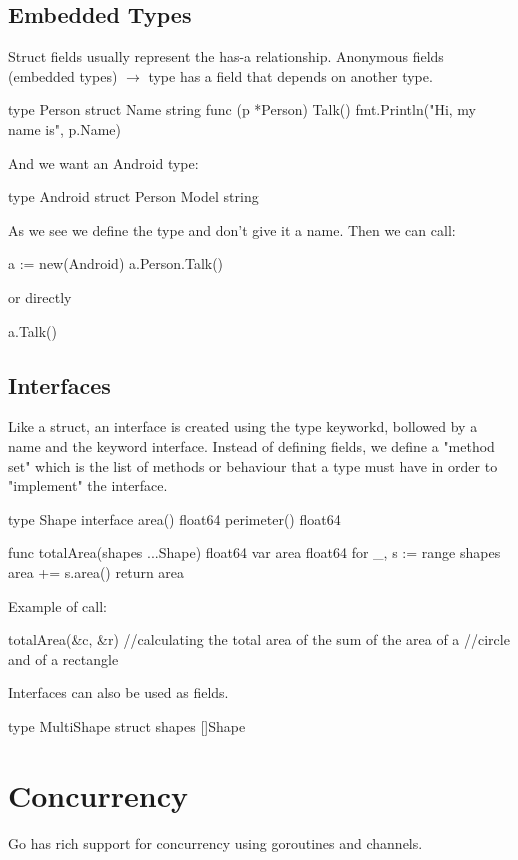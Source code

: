 \documentclass[twoside,a4paper,english]{report}
\begin{document}
\section{Embedded Types}
Struct fields usually represent the has-a relationship. Anonymous fields (embedded types) $\rightarrow$ type has a field that depends on another type.
\begin{go}
type Person struct {
  Name string
}
func (p *Person) Talk() {
  fmt.Println("Hi, my name is", p.Name)
}
\end{go}
\vspace{0.7cm}
And we want an Android type:
\begin{go}
type Android struct {
  Person
  Model string
}
\end{go}
\vspace{0.7cm}
As we see we define the type and don't give it a name. Then we can call:
\begin{go}
a := new(Android)
a.Person.Talk()
\end{go}
\vspace{0.7cm}
or directly
\begin{go}
a.Talk()
\end{go}
\section{Interfaces}
Like a struct, an interface is created using the type keyworkd, bollowed by a name and the keyword interface. Instead of defining fields, we define a "method set" which is the list of methods or behaviour that a type must have in order to "implement" the interface.
\begin{go}
type Shape interface {
  area() float64
  perimeter() float64
}   

func totalArea(shapes ...Shape) float64 {
  var area float64
  for _, s := range shapes {
      area += s.area()
  }
  return area
}
\end{go} 
\vspace{0.7cm}
Example of call:
\begin{go} 
totalArea(&c, &r) //calculating the total area of the sum of the area of a 
                  //circle and of a rectangle
\end{go}   
\vspace{0.7cm}               
Interfaces can also be used as fields.
\begin{go}
type MultiShape struct{
  shapes []Shape
}   
\end{go}
\chapter{Concurrency}
Go has rich support for concurrency using goroutines and channels.\\
\end{document}
